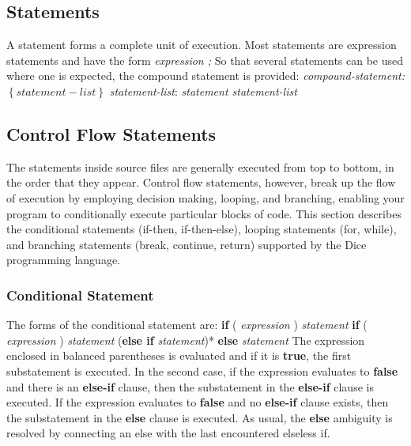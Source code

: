 \begin{homeworkProblem}
	\chapter{Statements}
	A statement forms a complete unit of execution. Most statements are expression statements and have the form \newline
    \textit{expression ;}
    \newline
    \newline
    So that several statements can be used where one is expected, the compound statement is provided:
    \newline
    \textit{compound-statement:}\newline
        \textit{ $\left\{ statement-list \right\}$ }
    \newline
    \newline
    \textit{statement-list}:\newline
    \textit{statement statement-list}
	
    \section{Control Flow Statements}
	The statements inside source files are generally executed from top to bottom, in the order that they appear. Control flow statements, however, break up the flow of execution by employing decision making, looping, and branching, enabling your program to conditionally execute particular blocks of code. This section describes the conditional statements (if-then, if-then-else), looping statements (for, while), and branching statements (break, continue, return) supported by the Dice programming language.

	\subsection{Conditional Statement}
    The forms of the conditional statement are:\newline
    \textbf{if} ( \textit{expression} ) \textit{statement}
    \newline
    \textbf{if} ( \textit{expression} ) \textit{statement} (\textbf{else if} \textit{statement})* \textbf{else} \textit{statement}
    \newline
    \newline
	The expression enclosed in balanced parentheses is evaluated and if it is \textbf{true}, the first substatement is executed. In the second case, if the expression evaluates to \textbf{false} and there is an \textbf{else-if} clause, then the substatement in the \textbf{else-if} clause is executed. If the expression evaluates to \textbf{false} and no \textbf{else-if} clause exists, then the substatement in the \textbf{else} clause is executed. As usual, the \textbf{else} ambiguity is resolved by connecting an else with the last encountered elseless if.
		

\end{homeworkProblem}
